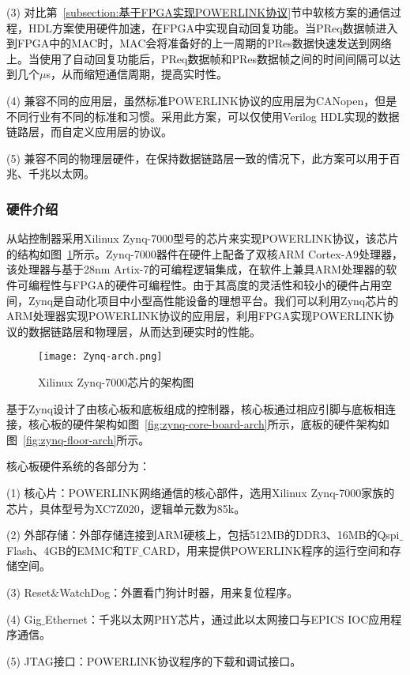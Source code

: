 (3) 对比第~\ref{subsection:基于FPGA实现POWERLINK协议}节中软核方案的通信过程，HDL方案使用硬件加速，在FPGA中实现自动回复功能。当PReq数据帧进入到FPGA中的MAC时，MAC会将准备好的上一周期的PRes数据快速发送到网络上。当使用了自动回复功能后，PReq数据帧和PRes数据帧之间的时间间隔可以达到几个$\mu$s，从而缩短通信周期，提高实时性。

(4) 兼容不同的应用层，虽然标准POWERLINK协议的应用层为CANopen，但是不同行业有不同的标准和习惯。采用此方案，可以仅使用Verilog HDL实现的数据链路层，而自定义应用层的协议。

(5) 兼容不同的物理层硬件，在保持数据链路层一致的情况下，此方案可以用于百兆、千兆以太网。


\subsubsection{硬件介绍}

从站控制器采用Xilinux Zynq-7000型号的芯片来实现POWERLINK协议，该芯片的结构如图~\ref{fig:Zynq-arch}所示。Zynq-7000器件在硬件上配备了双核ARM Cortex-A9处理器，该处理器与基于28nm Artix-7的可编程逻辑集成，在软件上兼具ARM处理器的软件可编程性与FPGA的硬件可编程性。由于其高度的灵活性和较小的硬件占用空间，Zynq是自动化项目中小型高性能设备的理想平台\cite{zynq-7000}。我们可以利用Zynq芯片的ARM处理器实现POWERLINK协议的应用层，利用FPGA实现POWERLINK协议的数据链路层和物理层，从而达到硬实时的性能。

\begin{figure}[!htb]
	\centering
	\texttt{[image: Zynq-arch.png]}
	\caption{Xilinux Zynq-7000芯片的架构图}
	\label{fig:Zynq-arch}
\end{figure}

基于Zynq设计了由核心板和底板组成的控制器，核心板通过相应引脚与底板相连接，核心板的硬件架构如图~\ref{fig:zynq-core-board-arch}所示，底板的硬件架构如图~\ref{fig:zynq-floor-arch}所示。

核心板硬件系统的各部分为：

(1) 核心片：POWERLINK网络通信的核心部件，选用Xilinux Zynq-7000家族的芯片，具体型号为XC7Z020，逻辑单元数为85k。

(2) 外部存储：外部存储连接到ARM硬核上，包括512MB的DDR3、16MB的Qspi$\_$Flash、4GB的EMMC和TF$\_$CARD，用来提供POWERLINK程序的运行空间和存储空间。

(3) Reset$\&$WatchDog：外置看门狗计时器，用来复位程序。

(4) Gig$\_$Ethernet：千兆以太网PHY芯片，通过此以太网接口与EPICS IOC应用程序通信。

(5) JTAG接口：POWERLINK协议程序的下载和调试接口。

